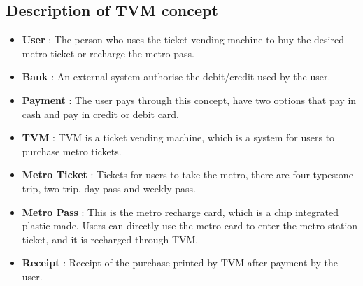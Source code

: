 \documentclass[15pt]{article}
\begin{document}
\subsection{\Large{Description of TVM concept}}
        \begin{itemize}
            \item {\Large\bfseries User} : The person who uses the ticket vending machine to buy the desired metro ticket or recharge the metro pass.
            \item {\Large\bfseries Bank } : An external system authorise the debit/credit used by the user.
            \item {\Large\bfseries Payment} : The user pays through this concept, have two options that pay in cash and pay in credit or debit card.
            \item {\Large\bfseries TVM} : TVM is a ticket vending machine, which is a system for users to purchase metro tickets.
            \item {\Large\bfseries Metro Ticket} : Tickets for users to take the metro, there are four types:one-trip, two-trip, day pass and weekly pass.
            \item {\Large\bfseries Metro Pass} : This is the metro recharge card, which is a chip integrated plastic made. Users can directly use the metro card to enter the metro station ticket, and it is recharged through TVM.
             \item {\Large\bfseries Receipt} : Receipt of the purchase printed by TVM after payment by the user.
        \end{itemize}
 
\end{document}
